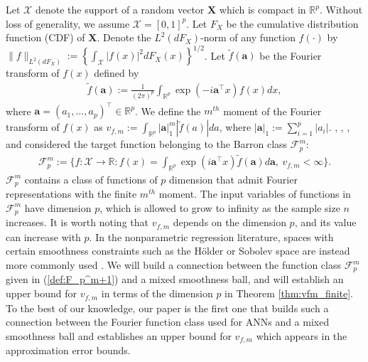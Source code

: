 \documentclass[11pt]{article}
\def\bs{\boldsymbol}
\numberwithin{equation}{section}
\begin{document}
Let $\mathcal{X}$ denote the  support of a random vector $\boldsymbol{X}$ which is compact in $\mathbb{R}^p$. Without loss of generality, we assume $\mathcal{X}=[0,1]^p$. Let $F_X$ be the cumulative distribution function (CDF) of $\boldsymbol{X}$. Denote the $L^2(dF_X)$-norm of any function $f(\cdot)$ by $\|f\|_{L^2(dF_X)}:=\left\{\int_{\mathcal{X}}|f(x)|^2dF_X(x)\right\}^{1/2}$. Let $\widetilde{f}(\bs{a})$ be the Fourier transform of $f(x)$ defined by
\begin{align*}
	\widetilde{f}(\bs{a}):=\frac{1}{(2\pi)^p}\int_{\mathbb{R}^p}\exp\left(-i \bs{a}^\top x \right)f(x)dx,
\end{align*}
where $\bs{a}=(a_1,...,a_p)^{\top}\in\mathbb{R}^p$. We define the $m^{th}$ moment of the Fourier transform of $f(x)$ as $v_{f,m}:=\int_{\mathbb{R}^p} |\bs{a}|_1^m|\widetilde{f}(a)|da$, where $|\bs{a}|_1:=\sum_{i=1}^p|a_i|$.
 \cite{barron1993universal}, \cite{hornik1994degree}, \cite{chen1999improved}, and \cite{klusowski2018approximation} considered the target function belonging to the Barron  class  $	\mathcal{F}_p^m$:
\begin{align}\label{def:F_p^m+1}
	\mathcal{F}^m_p:=\bigg\{ f:\mathcal{X}\to \mathbb{R}: f(x)=\int_{\mathbb{R}^p} \exp\left(i \bs{a}^\top x \right)\widetilde{f}(\bs{a}) d\bs{a}, \ v_{f,m}<\infty \bigg\}.
\end{align}
$\mathcal{F}^m_p$ contains a class of functions of $p$ dimension that admit Fourier representations  with the finite $m^{th}$ moment. The input variables of functions in $\mathcal{F}^m_p$ have dimension $p$, which is allowed to grow to infinity as the sample size $n$ increases.  It is worth noting that $v_{f,m}$ depends on the dimension $p$, and its value can increase with $p$. In the nonparametric regression literature, spaces with certain smoothness constraints such as the H\"{o}lder or Sobolev space are instead more commonly used \citep{stone1994,Wasserman2006,chen2007large}.  We will build a connection between the function class $\mathcal{F}_p^m$ given in (\ref{def:F_p^m+1}) and a mixed smoothness ball, and will establish an upper bound for $v_{f,m}$ in terms of the dimension $p$ in Theorem \ref{thm:vfm_finite}. To the best of our knowledge, our paper is the first one that builds such a connection between the Fourier function class used for ANNs and a mixed smoothness ball and establishes an upper bound for $v_{f,m}$  which appears in the approximation error bounds.
\end{document}
